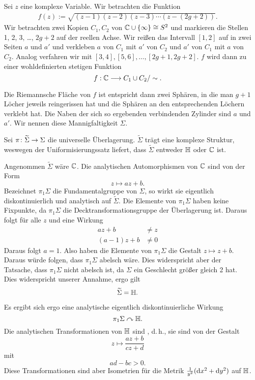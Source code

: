 
Sei $z$ eine komplexe Variable. Wir betrachten die Funktion
\begin{align*}
f(z) := \sqrt{(z-1)(z-2)(z-3) \cdots (z- (2g+2))}.
\end{align*}
Wir betrachten zwei Kopien $C_1, C_2$ von $\mathbb{C}\cup \{\infty\} \overset{}{\cong} S^2$ und markieren die Stellen 1, 2, 3, \ldots, $2g+2$ auf der reellen Achse. Wir reißen das Intervall $[1,2]$ auf in zwei Seiten $a$ und $a'$ und verkleben $a$ von $C_1$ mit $a'$ von $C_2$ und $a'$ von $C_1$ mit $a$ von $C_2$. Analog verfahren wir mit $[3,4], [5,6], \ldots, [2g+1, 2g+2]$. $f$ wird dann zu einer wohldefinierten stetigen Funktion
\[ f : \mathbb{C} \overset{}{\longrightarrow} C_1 \cup C_2 / \sim. \]

Die Riemannsche Fläche von $f$ ist entspricht dann zwei Sphären, in die man $g+1$ Löcher jeweils reingerissen hat und die Sphären an den entsprechenden Löchern verklebt hat. Die Naben der sich so ergebenden verbindenden Zylinder sind $a$ und $a'$. Wir nennen diese Mannigfaltigkeit $\Sigma$.

Sei $\pi \colon \widetilde{\Sigma} \overset{}{\rightarrow} \Sigma$ die universelle Überlagerung. $\widetilde{\Sigma}$ trägt eine komplexe Struktur, weswegen der Uniformisierungssatz liefert, dass $\widetilde{\Sigma}$ entweder $\mathbb{H}$ oder $\mathbb{C}$ ist.

Angenommen $\widetilde{\Sigma}$ wäre $\mathbb{C}$. Die analytischen Automorphismen von $\mathbb{C}$ sind von der Form
\[ z \longmapsto a z +b. \]
Bezeichnet $\pi_1 \Sigma$ die Fundamentalgruppe von $\Sigma$, so wirkt sie eigentlich diskontinuierlich und analytisch auf $\widetilde{\Sigma}$. Die Elemente von $\pi_1\Sigma$ haben keine Fixpunkte, da $\pi_1 \Sigma$ die Decktransformationsgruppe der Überlagerung ist. Daraus folgt für alle $z$ und eine Wirkung
\begin{align*}
az+b &\neq z\\
(a-1)z+b &\neq 0
\end{align*}
Daraus folgt $a = 1$. Also haben die Elemente von $\pi_1 \Sigma$ die Gestalt $z\mapsto z + b$. Daraus würde folgen, dass $\pi_1 \Sigma$ abelsch wäre. Dies widerspricht aber der Tatsache, dass $\pi_1 \Sigma$ nicht abelsch ist, da $\Sigma$ ein Geschlecht größer gleich 2 hat. Dies widerspricht unserer Annahme, ergo gilt
\[ \widetilde{\Sigma} =  \mathbb{H}. \]

Es ergibt sich ergo eine analytische eigentlich diskontinuierliche Wirkung
\[ \pi_1 \Sigma \curvearrowright \mathbb{H}. \]
Die analytischen Transformationen von $\mathbb{H}$ sind , d.\,h., sie sind von der Gestalt
\[ z \longmapsto \frac{az+b}{cz + d} \]
mit
\[ ad - bc > 0.\]
Diese Transformationen sind aber Isometrien für die Metrik $\frac{1}{y^2}(\text{d} x^2 + \text{d} y^2)$ auf $\mathbb{H}$.

